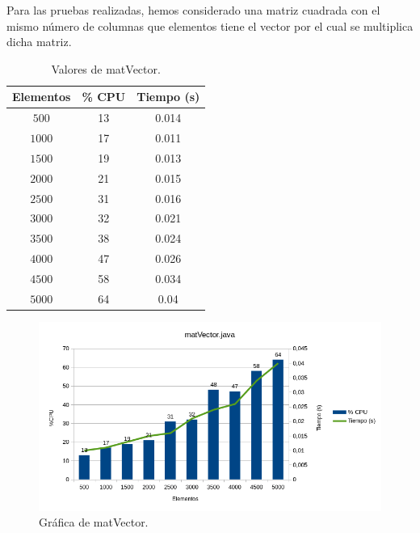 \documentclass[12pt,letterpaper]{article}
\begin{document}
Para las pruebas realizadas, hemos considerado una matriz cuadrada con el mismo número de columnas que elementos tiene el vector por el cual se multiplica dicha matriz.
\begin{center}
	\begin{table}[htbp]
		\begin{center}
			\begin{tabular}{|c|c|c|}
				\hline
				\textbf{Elementos} & \textbf{\% CPU} & \textbf{Tiempo (s)}  \\
				\hline 
				$500$ & 13 & 0.014\\ \hline	
				$1000$ & 17 & 0.011\\ \hline
				$1500$ & 19 & 0.013\\ \hline
				$2000$ & 21 & 0.015\\ \hline
				$2500$ & 31 & 0.016\\ \hline
				$3000$ & 32 & 0.021\\ \hline
				$3500$ & 38 & 0.024\\ \hline
				$4000$ & 47 & 0.026\\ \hline
				$4500$ & 58 & 0.034\\ \hline
				$5000$ & 64 & 0.04\\ \hline			
			\end{tabular}
			\caption{Valores de matVector.}
			\label{tabla:Valores de matVector}
		\end{center}
	\end{table}
\end{center}
\begin{figure}[h]
	\begin{center}
		\includegraphics[scale=0.8]{matVector.png}
		\caption{Gráfica de matVector.}
		\label{fig: matVector}
	\end{center}
\end{figure}
\end{document}
